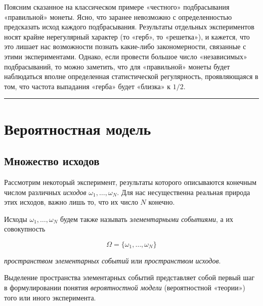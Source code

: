 \documentclass[11pt,a4paper]{article}
\renewcommand{\linethickness}{0.1ex}
\begin{document}
    Поясним сказанное на классическом примере «честного» подбрасывания
«правильной» монеты. Ясно, что заранее невозможно с определенностью
предсказать исход каждого подбрасывания. Результаты отдельных
экспериментов носят крайне нерегулярный характер (то «герб», то
«решетка»), и кажется, что это лишает нас возможности познать какие-либо
закономерности, связанные с этими экспериментами. Однако, если провести
большое число «независимых» подбрасываний, то можно заметить, что для
«правильной» монеты будет наблюдаться вполне определенная статистической
регулярность, проявляющаяся в том, что частота выпадания «герба» будет
«близка» к \(1/2\).

    \begin{center}\rule{0.5\linewidth}{\linethickness}\end{center}

    \hypertarget{ux432ux435ux440ux43eux44fux442ux43dux43eux441ux442ux43dux430ux44f-ux43cux43eux434ux435ux43bux44c}{%
\section{Вероятностная
модель}\label{ux432ux435ux440ux43eux44fux442ux43dux43eux441ux442ux43dux430ux44f-ux43cux43eux434ux435ux43bux44c}}

    \hypertarget{ux43cux43dux43eux436ux435ux441ux442ux432ux43e-ux438ux441ux445ux43eux434ux43eux432}{%
\subsection{Множество
исходов}\label{ux43cux43dux43eux436ux435ux441ux442ux432ux43e-ux438ux441ux445ux43eux434ux43eux432}}

Рассмотрим некоторый эксперимент, результаты которого описываются
конечным числом различных \emph{исходов} \(\omega_1, \dots , \omega_N\).
Для нас несущественна реальная природа этих исходов, важно лишь то, что
их число \(N\) конечно.

Исходы \(\omega_1, \dots , \omega_N\) будем также называть
\emph{элементарными событиями}, а их совокупность

\[ \Omega = \{ \omega_1, \dots , \omega_N \} \]

\emph{пространством элементарных событий} или \emph{пространством
исходов}.

Выделение пространства элементарных событий представляет собой первый
шаг в формулировании понятия \emph{вероятностной модели} (вероятностной
«теории») того или иного эксперимента.
\end{document}

